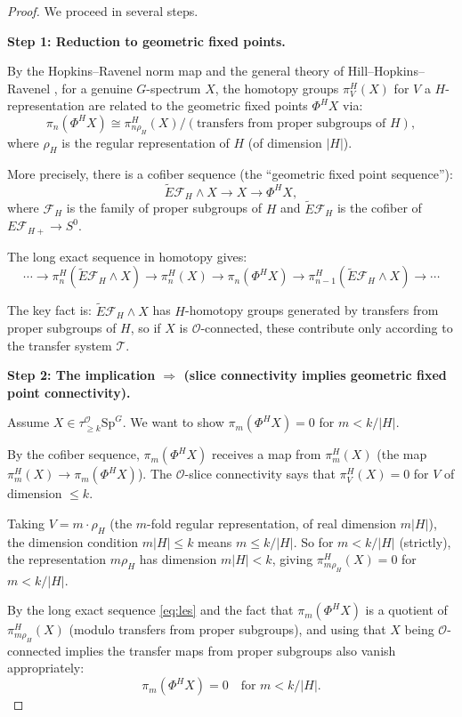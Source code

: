 \documentclass[12pt]{article}
\begin{document}
\begin{proof}
We proceed in several steps.

\textbf{Step 1: Reduction to geometric fixed points.}

By the Hopkins--Ravenel norm map and the general theory of Hill--Hopkins--Ravenel \cite{HHR2016}, for a genuine $G$-spectrum $X$, the homotopy groups $\pi_V^H(X)$ for $V$ a $H$-representation are related to the geometric fixed points $\Phi^H X$ via:
\[
\pi_n(\Phi^H X) \cong \pi_{n\rho_H}^H(X) / (\text{transfers from proper subgroups of } H),
\]
where $\rho_H$ is the regular representation of $H$ (of dimension $|H|$).

More precisely, there is a cofiber sequence (the ``geometric fixed point sequence''):
\[
\tilde{E}\mathcal{F}_H \wedge X \to X \to \Phi^H X,
\]
where $\mathcal{F}_H$ is the family of proper subgroups of $H$ and $\tilde{E}\mathcal{F}_H$ is the cofiber of $E\mathcal{F}_{H+} \to S^0$.

The long exact sequence in homotopy gives:
\begin{equation}\label{eq:les}
\cdots \to \pi_n^H(\tilde{E}\mathcal{F}_H \wedge X) \to \pi_n^H(X) \to \pi_n(\Phi^H X) \to \pi_{n-1}^H(\tilde{E}\mathcal{F}_H \wedge X) \to \cdots
\end{equation}

The key fact is: $\tilde{E}\mathcal{F}_H \wedge X$ has $H$-homotopy groups generated by transfers from proper subgroups of $H$, so if $X$ is $\mathcal{O}$-connected, these contribute only according to the transfer system $\mathcal{T}$.

\textbf{Step 2: The implication $\Rightarrow$ (slice connectivity implies geometric fixed point connectivity).}

Assume $X \in \tau_{\geq k}^{\mathcal{O}} \mathrm{Sp}^G$. We want to show $\pi_m(\Phi^H X) = 0$ for $m < k/|H|$.

By the cofiber sequence, $\pi_m(\Phi^H X)$ receives a map from $\pi_m^H(X)$ (the map $\pi_m^H(X) \to \pi_m(\Phi^H X)$). The $\mathcal{O}$-slice connectivity says that $\pi_V^H(X) = 0$ for $V$ of dimension $\leq k$.

Taking $V = m \cdot \rho_H$ (the $m$-fold regular representation, of real dimension $m|H|$), the dimension condition $m|H| \leq k$ means $m \leq k/|H|$. So for $m < k/|H|$ (strictly), the representation $m\rho_H$ has dimension $m|H| < k$, giving $\pi_{m\rho_H}^H(X) = 0$ for $m < k/|H|$.

By the long exact sequence \eqref{eq:les} and the fact that $\pi_m(\Phi^H X)$ is a quotient of $\pi_{m\rho_H}^H(X)$ (modulo transfers from proper subgroups), and using that $X$ being $\mathcal{O}$-connected implies the transfer maps from proper subgroups also vanish appropriately:
\[
\pi_m(\Phi^H X) = 0 \quad \text{for } m < k/|H|.
\]


\end{proof}
\end{document}
